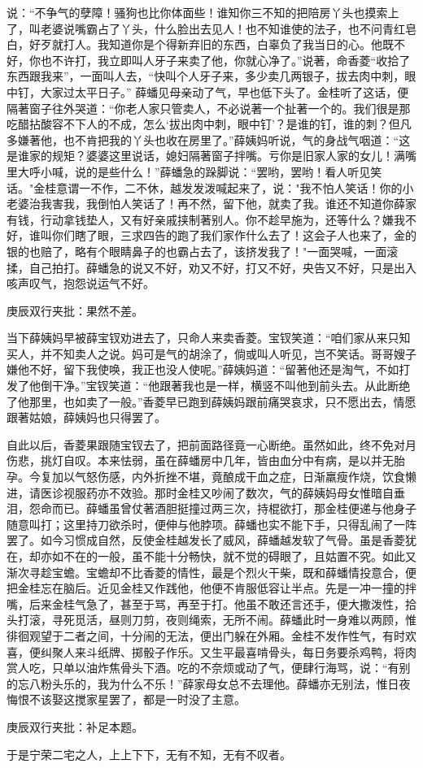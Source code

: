 \begin{parag}
说：“不争气的孽障！骚狗也比你体面些！谁知你三不知的把陪房丫头也摸索上了，叫老婆说嘴霸占了丫头，什么脸出去见人！也不知谁使的法子，也不问青红皂白，好歹就打人。我知道你是个得新弃旧的东西，白辜负了我当日的心。他既不好，你也不许打，我立即叫人牙子来卖了他，你就心净了。”说著，命香菱“收拾了东西跟我来”，一面叫人去，“快叫个人牙子来，多少卖几两银子，拔去肉中刺，眼中钉，大家过太平日子。” 薛蟠见母亲动了气，早也低下头了。金桂听了这话，便隔著窗子往外哭道：“你老人家只管卖人，不必说著一个扯著一个的。我们很是那吃醋拈酸容不下人的不成，怎么‘拔出肉中刺，眼中钉’？是谁的钉，谁的刺？但凡多嫌著他，也不肯把我的丫头也收在房里了。”薛姨妈听说，气的身战气咽道：“这是谁家的规矩？婆婆这里说话，媳妇隔著窗子拌嘴。亏你是旧家人家的女儿！满嘴里大呼小喊，说的是些什么！”薛蟠急的跺脚说：“罢哟，罢哟！看人听见笑话。"金桂意谓一不作，二不休，越发发泼喊起来了，说："我不怕人笑话！你的小老婆治我害我，我倒怕人笑话了！再不然，留下他，就卖了我。谁还不知道你薛家有钱，行动拿钱垫人，又有好亲戚挟制著别人。你不趁早施为，还等什么？嫌我不好，谁叫你们瞎了眼，三求四告的跑了我们家作什么去了！这会子人也来了，金的银的也赔了，略有个眼睛鼻子的也霸占去了，该挤发我了！"一面哭喊，一面滚揉，自己拍打。薛蟠急的说又不好，劝又不好，打又不好，央告又不好，只是出入咳声叹气，抱怨说运气不好。\begin{note}庚辰双行夹批：果然不差。\end{note}当下薛姨妈早被薛宝钗劝进去了，只命人来卖香菱。宝钗笑道：“咱们家从来只知买人，并不知卖人之说。妈可是气的胡涂了，倘或叫人听见，岂不笑话。哥哥嫂子嫌他不好，留下我使唤，我正也没人使呢。”薛姨妈道：“留著他还是淘气，不如打发了他倒干净。”宝钗笑道：“他跟著我也是一样，横竖不叫他到前头去。从此断绝了他那里，也如卖了一般。”香菱早已跑到薛姨妈跟前痛哭哀求，只不愿出去，情愿跟著姑娘，薛姨妈也只得罢了。
\end{parag}


\begin{parag}
    自此以后，香菱果跟随宝钗去了，把前面路径竟一心断绝。虽然如此，终不免对月伤悲，挑灯自叹。本来怯弱，虽在薛蟠房中几年，皆由血分中有病，是以并无胎孕。今复加以气怒伤感，内外折挫不堪，竟酿成干血之症，日渐羸瘦作烧，饮食懒进，请医诊视服药亦不效验。那时金桂又吵闹了数次，气的薛姨妈母女惟暗自垂泪，怨命而已。薛蟠虽曾仗著酒胆挺撞过两三次，持棍欲打，那金桂便递与他身子随意叫打；这里持刀欲杀时，便伸与他脖项。薛蟠也实不能下手，只得乱闹了一阵罢了。如今习惯成自然，反使金桂越发长了威风，薛蟠越发软了气骨。虽是香菱犹在，却亦如不在的一般，虽不能十分畅快，就不觉的碍眼了，且姑置不究。如此又渐次寻趁宝蟾。宝蟾却不比香菱的情性，最是个烈火干柴，既和薛蟠情投意合，便把金桂忘在脑后。近见金桂又作践他，他便不肯服低容让半点。先是一冲一撞的拌嘴，后来金桂气急了，甚至于骂，再至于打。他虽不敢还言还手，便大撒泼性，拾头打滚，寻死觅活，昼则刀剪，夜则绳索，无所不闹。薛蟠此时一身难以两顾，惟徘徊观望于二者之间，十分闹的无法，便出门躲在外厢。金桂不发作性气，有时欢喜，便纠聚人来斗纸牌、掷骰子作乐。又生平最喜啃骨头，每日务要杀鸡鸭，将肉赏人吃，只单以油炸焦骨头下酒。吃的不奈烦或动了气，便肆行海骂，说：“有别的忘八粉头乐的，我为什么不乐！”薛家母女总不去理他。薛蟠亦无别法，惟日夜悔恨不该娶这搅家星罢了，都是一时没了主意。\begin{note}庚辰双行夹批：补足本题。\end{note}于是宁荣二宅之人，上上下下，无有不知，无有不叹者。
\end{parag}



